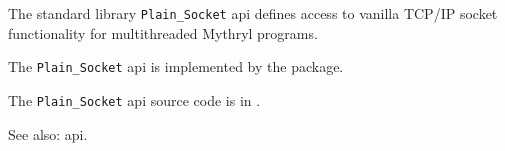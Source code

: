 
The standard library {\tt Plain\_Socket} api defines access to vanilla {\sc TCP/IP} socket functionality for multithreaded Mythryl programs.

The {\tt Plain\_Socket} api is implemented by the  package.

The {\tt Plain\_Socket} api source code is in .

See also:   api.




